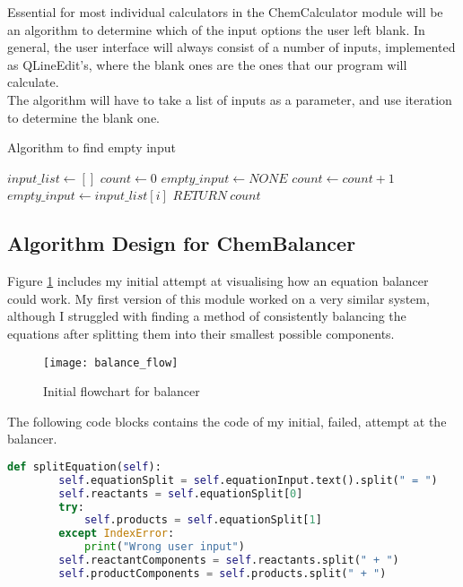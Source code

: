 \documentclass[a4paper,12pt]{article}
\begin{document}
Essential for most individual calculators in the ChemCalculator module will be an algorithm to determine which of the input options the user left blank. In general, the user interface will always consist of a number of inputs, implemented as QLineEdit's, where the blank ones are the ones that our program will calculate.\\
The algorithm will have to take a list of inputs as a parameter, and use iteration to determine the blank one.

\begin{algorithm}
\caption{Algorithm to find empty input}\label{alg:fing_empty_input}
\begin{algorithmic}
\State $ input\_list \gets []$
\State $ count \gets 0$
\State $ empty\_input \gets NONE$
	\State $ count \gets count\ $+$\ 1$
	\State $ empty\_input \gets input\_list[i]$
\EndIf
\EndFor
{}
	\State $ RETURN\ count$
\EndIf
\end{algorithmic}
\end{algorithm}

\newpage

\subsection{Algorithm Design for ChemBalancer}

Figure \ref{fig:balance_flow} includes my initial attempt at visualising how an equation balancer could work. My first version of this module worked on a very similar system, although I struggled with finding a method of consistently balancing the equations after splitting them into their smallest possible components. 

\begin{figure} [h]
	\centering
	\texttt{[image: balance\_flow]}
	\caption{Initial flowchart for balancer}
	\label{fig:balance_flow}
\end{figure}

The following code blocks contains the code of my initial, failed, attempt at the balancer.

\begin{lstlisting}[language=Python, caption=Method for splitting equation into components, label={lst:split_equation}]
def splitEquation(self):
        self.equationSplit = self.equationInput.text().split(" = ")
        self.reactants = self.equationSplit[0]
        try:
            self.products = self.equationSplit[1]
        except IndexError:
            print("Wrong user input")
        self.reactantComponents = self.reactants.split(" + ")
        self.productComponents = self.products.split(" + ")
\end{lstlisting}
\end{document}
